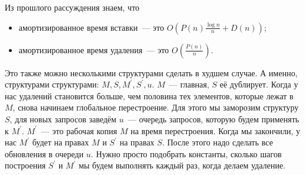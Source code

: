 Из прошлого рассуждения знаем, что

\begin{itemize}
    \item амортизированное время вставки~--- это $O\left(P(n)\frac{\log n}{n}+D(n)\right)$;
    \item амортизированное время удаления~--- это $O\left(\frac{P(n)}{n}\right)$.
\end{itemize}

Это также можно несколькими структурами сделать в худшем случае. А именно, структурами структурами: $M,S,M^\prime,S^\prime,u$. $M$~--- главная, $S$ её дублирует. Когда у нас удалений становится больше, чем половина тех элементов, которые лежат в $M$, снова начинаем глобальное перестроение. Для этого мы заморозим структуру $S$, для новых запросов заведём $ u$~--- очередь запросов, которую будем применять к $M^\prime$. $M^\prime$~--- это рабочая копия $M$ на время перестроения. Когда мы закончили, у нас $M^\prime$ будет на правах $M$ и $S^\prime$ на правах $S$. После этого надо сделать все обновления в очереди $u$. Нужно просто подобрать константы, сколько шагов построения $S^\prime$ и $M^\prime$ мы будем выполнять каждый раз, когда делаем удаление.
